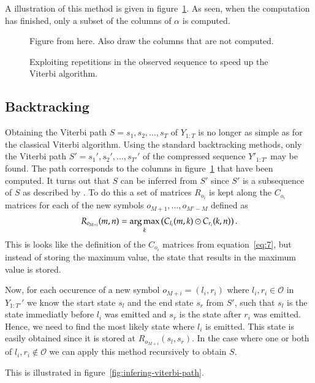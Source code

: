 A illustration of this method is given in
figure~\ref{fig:exploiting-repetitions}. As seen, when the computation has
finished, only a subset of the columns of $\alpha$ is computed.

\begin{figure}
  \centering
  Figure from \citet{sand2013ziphmmlib} here. Also draw the columns that are
  not computed.
  \caption{Exploiting repetitions in the observed sequence to speed up the
    Viterbi algorithm.}
  \label{fig:exploiting-repetitions}
\end{figure}

\subsection{Backtracking}
\label{sec:backtracking}

Obtaining the Viterbi path $S = s_1, s_2, \dots, s_T$ of $Y_{1:T}$ is no longer
as simple as for the classical Viterbi algorithm. Using the standard
backtracking methods, only the Viterbi path $S' = s_1', s_2', \dots, s_{T'}'$
of the compressed sequence $Y'_{1:T'}$ may be found. The path corresponds to
the columns in figure~\ref{fig:exploiting-repetitions} that have been
computed. It turns out that $S$ can be inferred from $S'$ since $S'$
is a subsequence of $S$ as described by \citet{lifshits2009speeding}. To do
this a set of matrices $R_{o_i}$ is kept along the $C_{o_i}$ matrices for each
of the new symbols $o_{M + 1}, \dots, o_{M' - M}$ defined as
\begin{equation*}
  R_{o_{M + i}}(m, n) = \operatorname*{arg\,max}_k
  \left(
    C_{l_i}(m, k) \odot C_{r_i}(k, n)
  \right).
\end{equation*}
This is looks like the definition of the $C_{o_i}$ matrices from
equation~\eqref{eq:7}, but instead of storing the maximum value, the state that
results in the maximum value is stored.

Now, for each occurence of a new symbol $o_{M + i} = (l_i, r_i)$ where
$l_i, r_i \in \mathcal{O}$ in $Y_{1:T'}'$ we know the start state $s_l$ and the
end state $s_r$ from $S'$, such that $s_l$ is the state immediatly before $l_i$
was emitted and $s_r$ is the state after $r_i$ was emitted. Hence, we need to
find the most likely state where $l_i$ is emitted. This state is easily
obtained since it is stored at $R_{o_{M + i}}(s_l, s_r)$. In the case where one
or both of $l_i, r_i \not \in \mathcal{O}$ we can apply this method
recursively to obtain $S$.

This is illustrated in figure~\ref{fig:infering-viterbi-path}.

